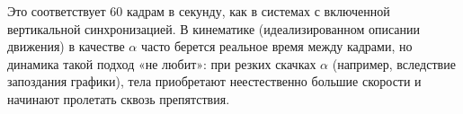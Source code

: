 Это соответствует 60 кадрам в секунду, как в системах с
включенной вертикальной синхронизацией.
В кинематике (идеализированном описании движения) в
качестве \begin{math}\alpha\end{math} часто берется реальное время между кадрами, но
динамика такой подход «не любит»: при резких скачках \begin{math}\alpha\end{math}
(например, вследствие запоздания графики), тела
приобретают неестественно большие скорости и начинают
пролетать сквозь препятствия.
